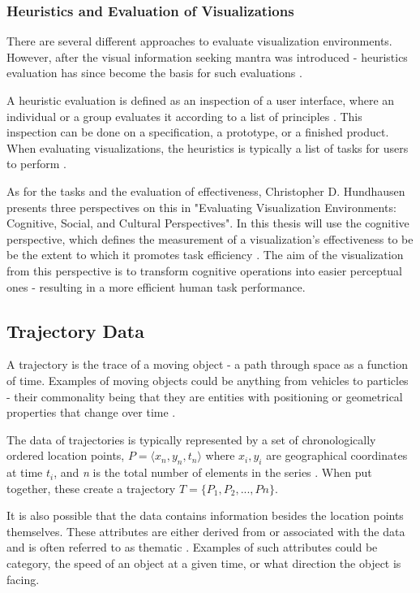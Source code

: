 \documentclass{kththesis}
\begin{document}
\subsubsection{Heuristics and Evaluation of Visualizations}

There are several different approaches to evaluate visualization environments. However, after the visual information seeking mantra was introduced - heuristics evaluation has since become the basis for such evaluations \cite{Freitas2014}.

A heuristic evaluation is defined as an inspection of a user interface, where an individual or a group evaluates it according to a list of principles \cite{Wilson20141}. This inspection can be done on a specification, a prototype, or a finished product. When evaluating visualizations, the heuristics is typically a list of tasks for users to perform \cite{Freitas2014}.


As for the tasks and the evaluation of effectiveness, Christopher D. Hundhausen presents three perspectives on this in "Evaluating Visualization Environments: Cognitive, Social, and Cultural Perspectives". In this thesis will use the cognitive perspective, which defines the measurement of a visualization's effectiveness to be be the extent to which it promotes task efficiency \cite{Hundhausen2014}. The aim of the visualization from this perspective is to transform cognitive operations into easier perceptual ones -  resulting in a more efficient human task performance.


\subsection{Trajectory Data}


A trajectory is the trace of a moving object - a path through space as a function of time.
Examples of moving objects could be anything from vehicles to particles - their commonality being that they are entities with positioning or geometrical properties that change over time \cite{Tradef2}.

The data of trajectories is typically represented by a set of chronologically ordered location points, $ P = \langle x_{n}, y_{n}, t_{n} \rangle $ where $x_{i}, y_{i}$ are geographical coordinates at time $t_{i}$, and \emph{n} is the total number of elements in the series \cite{Tradef1}. When put together, these create a trajectory $ T = \{ P_{1}, P_{2},...,P{n} \} $.

It is also possible that the data contains information besides the location points themselves. These attributes are either derived from or associated with the data and is often referred to as thematic \cite{Ref1}. Examples of such attributes could be category, the speed of an object at a given time, or what direction the object is facing.
\end{document}
